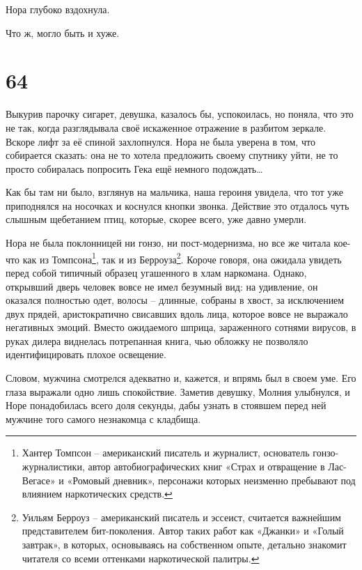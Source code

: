 \documentclass[
  a5paperpaper,
  DIV=11,
  numbers=noendperiod]{scrreprt}
\begin{document}
Нора глубоко вздохнула.

Что ж, могло быть и хуже.

\section*{64}\label{64}


Выкурив парочку сигарет, девушка, казалось бы, успокоилась, но поняла,
что это не так, когда разглядывала своё искаженное отражение в разбитом
зеркале. Вскоре лифт за её спиной захлопнулся. Нора не была уверена в
том, что собирается сказать: она не то хотела предложить своему спутнику
уйти, не то просто собиралась попросить Гека ещё немного
подождать\ldots{}

Как бы там ни было, взглянув на мальчика, наша героиня увидела, что тот
уже приподнялся на носочках и коснулся кнопки звонка. Действие это
отдалось чуть слышным щебетанием птиц, которые, скорее всего, уже давно
умерли.

Нора не была поклонницей ни гонзо, ни пост-модернизма, но все же читала
кое-что как из Томпсона\footnote{Хантер Томпсон -- американский писатель
  и журналист, основатель гонзо-журналистики, автор автобиографических
  книг «Страх и отвращение в Лас-Вегасе» и «Ромовый дневник», персонажи
  которых неизменно пребывают под влиянием наркотических средств.}, так
и из Берроуза\footnote{Уильям Берроуз -- американский писатель и
  эссеист, считается важнейшим представителем бит-поколения. Автор таких
  работ как «Джанки» и «Голый завтрак», в которых, основываясь на
  собственном опыте, детально знакомит читателя со всеми оттенками
  наркотической палитры.}. Короче говоря, она ожидала увидеть перед
собой типичный образец угашенного в хлам наркомана. Однако, открывший
дверь человек вовсе не имел безумный вид: на удивление, он оказался
полностью одет, волосы -- длинные, собраны в хвост, за исключением двух
прядей, аристократично свисавших вдоль лица, которое вовсе не выражало
негативных эмоций. Вместо ожидаемого шприца, зараженного сотнями
вирусов, в руках дилера виднелась потрепанная книга, чью обложку не
позволяло идентифицировать плохое освещение.

Словом, мужчина смотрелся адекватно и, кажется, и впрямь был в своем
уме. Его глаза выражали одно лишь спокойствие. Заметив девушку, Молния
улыбнулся, и Норе понадобилась всего доля секунды, дабы узнать в
стоявшем перед ней мужчине того самого незнакомца с кладбища.
\end{document}
